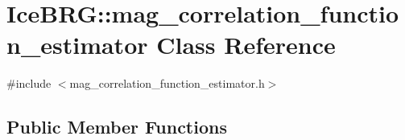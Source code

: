 \hypertarget{classIceBRG_1_1mag__correlation__function__estimator}{\section{Ice\-B\-R\-G\-:\-:mag\-\_\-correlation\-\_\-function\-\_\-estimator Class Reference}
\label{classIceBRG_1_1mag__correlation__function__estimator}
}


{\ttfamily \#include $<$mag\-\_\-correlation\-\_\-function\-\_\-estimator.\-h$>$}

\subsection*{Public Member Functions}
